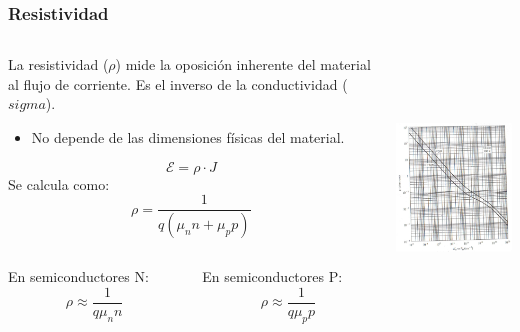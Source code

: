 \documentclass[10pt,t,aspectratio=169]{beamer}
\begin{document}
\begin{frame}[t]
    \frametitle{Resistividad}

    \begin{columns}
    
        \begin{column}{0.5\textwidth}
        
            La resistividad ($\rho$) mide la oposición inherente del material al flujo de corriente. Es el inverso de la conductividad ($sigma$).
            \begin{itemize}
                \item No depende de las dimensiones físicas del material.
            \end{itemize}
            \[ \mathcal{E} = \rho \cdot J \]
            Se calcula como:
            \[ \rho = \dfrac{1}{q(\mu_n n + \mu_p p)} \]
            \begin{columns}
            
                \begin{column}{0.5\textwidth}
                
                    En semiconductores N:
                  \[ \rho \approx \dfrac{1}{q\mu_n n} \]
                  
                \end{column}
                
                \begin{column}{0.5\textwidth}
                
                    En semiconductores P:
                   \[ \rho \approx \dfrac{1}{q\mu_p p} \]
                   
                \end{column}
                
            \end{columns}
            
        \end{column}
        
        \begin{column}{0.5\textwidth}
        
            \centering
            \includegraphics[height=7cm]{./figures/resistividad.png}
            

\end{column}
\end{columns}
\end{frame}
\end{document}
